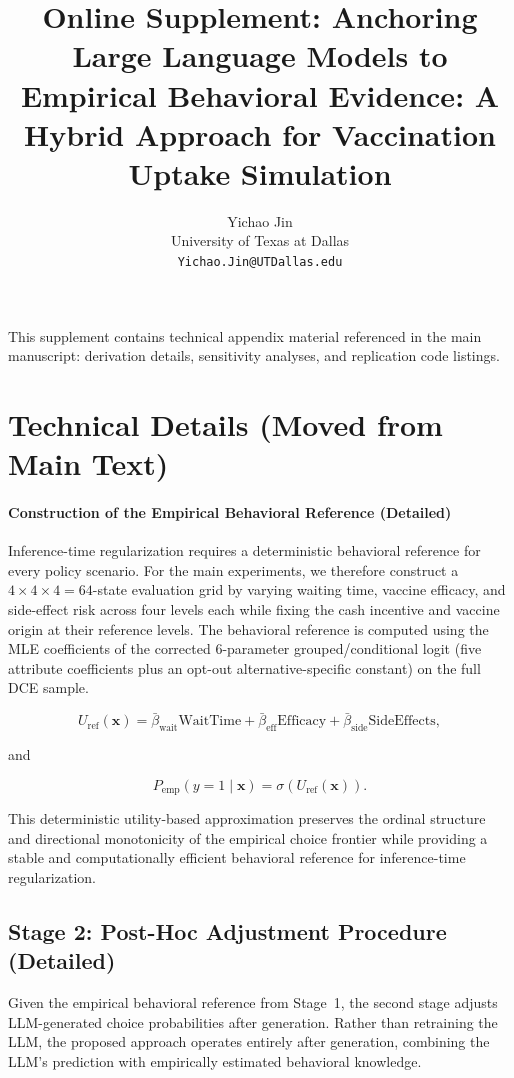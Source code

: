 \documentclass[11pt]{article}
\title{Online Supplement: Anchoring Large Language Models to Empirical Behavioral Evidence: A Hybrid Approach for Vaccination Uptake Simulation}
\author{Yichao Jin \\ University of Texas at Dallas \\ \texttt{Yichao.Jin@UTDallas.edu}}
\date{}
\begin{document}
\maketitle

This supplement contains technical appendix material referenced in the main manuscript: derivation details, sensitivity analyses, and replication code listings.

\appendix
\section{Technical Details (Moved from Main Text)}
\paragraph{Construction of the Empirical Behavioral Reference (Detailed)}

\medskip

Inference-time regularization requires a deterministic behavioral reference for every policy scenario. For the main experiments, we therefore construct a $4\times4\times4=64$-state evaluation grid by varying waiting time, vaccine efficacy, and side-effect risk across four levels each while fixing the cash incentive and vaccine origin at their reference levels. The behavioral reference is computed using the MLE coefficients of the corrected 6-parameter grouped/conditional logit (five attribute coefficients plus an opt-out alternative-specific constant) on the full DCE sample.

\[
U_{\mathrm{ref}}(\mathbf{x})
=
\bar{\beta}_{\mathrm{wait}}\mathrm{WaitTime}
+
\bar{\beta}_{\mathrm{eff}}\mathrm{Efficacy}
+
\bar{\beta}_{\mathrm{side}}\mathrm{SideEffects},
\]

and

\[
P_{\mathrm{emp}}(y=1\mid\mathbf{x})
=
\sigma\!\left(U_{\mathrm{ref}}(\mathbf{x})\right).
\]

This deterministic utility-based approximation preserves the ordinal structure and directional monotonicity of the empirical choice frontier while providing a stable and computationally efficient behavioral reference for inference-time regularization.
\subsection{Stage 2: Post-Hoc Adjustment Procedure (Detailed)}

\label{sec:stage2}

Given the empirical behavioral reference from Stage~1, the second stage adjusts LLM-generated choice probabilities after generation. Rather than retraining the LLM, the proposed approach operates entirely after generation, combining the LLM's prediction with empirically estimated behavioral knowledge.
\end{document}
